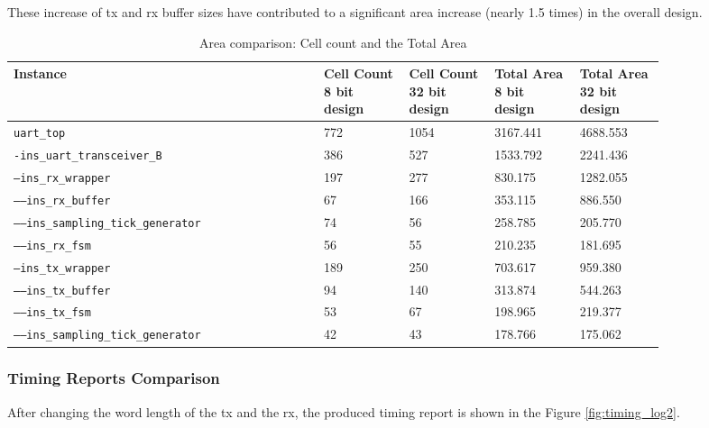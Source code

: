 \documentclass[a4paper,11pt]{article}%
\begin{document}
These increase of \ac{tx} and \ac{rx} buffer sizes have contributed to a significant area increase (nearly 1.5 times) in the overall design.

\begin{table}[h]
	\centering
	\caption{Area comparison: Cell count and the Total Area}
	\begin{tabular}{|L{0.4\linewidth}  |C{0.11\linewidth}  | C{0.11\linewidth}  |C{0.11\linewidth}  | C{0.11\linewidth} |} \hline
		Instance & Cell Count 8 bit design & Cell Count 32 bit design & Total Area 8 bit design & Total Area 32 bit design\\ \hline
{\tt uart\_top} 							& 772 & 1054 & 3167.441 & 4688.553\\ \hline
{\tt -ins\_uart\_transceiver\_B} 			& 386 &  527 & 1533.792 & 2241.436\\ \hline
{\tt ---ins\_rx\_wrapper} 					& 197 &  277 &  830.175 & 1282.055\\ \hline
{\tt -----ins\_rx\_buffer} 					&  67 &  166 &  353.115 &  886.550\\ \hline
{\tt -----ins\_sampling\_tick\_generator} 	&  74 &   56 &  258.785 &  205.770\\ \hline
{\tt -----ins\_rx\_fsm} 					&  56 &   55 &  210.235 &  181.695\\ \hline
{\tt ---ins\_tx\_wrapper} 					& 189 &  250 &  703.617 &  959.380\\ \hline
{\tt -----ins\_tx\_buffer} 					&  94 &  140 &  313.874 &  544.263\\ \hline
{\tt -----ins\_tx\_fsm} 					&  53 &   67 &  198.965 &  219.377\\ \hline
{\tt -----ins\_sampling\_tick\_generator} 	&  42 &   43 &  178.766 &  175.062\\ \hline		
	\end{tabular}
	\label{table:area_compare}
\end{table}

\subsubsection{Timing Reports Comparison}

After changing the word length of the \ac{tx} and the \ac{rx}, the produced timing report is shown in the Figure \ref{fig:timing_log2}.
\end{document}
